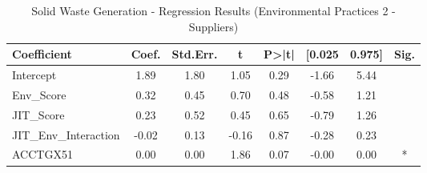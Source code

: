 \begin{table}[htbp]
    \centering
    \caption{Solid Waste Generation - Regression Results (Environmental Practices 2 - Suppliers)}
    \label{tab:regression}
    \begin{tabular}{lccccccc}
\toprule
Coefficient & Coef. & Std.Err. & t & P>|t| & [0.025 & 0.975] & Sig. \\
\midrule
Intercept & 1.89 & 1.80 & 1.05 & 0.29 & -1.66 & 5.44 &  \\
Env\_Score & 0.32 & 0.45 & 0.70 & 0.48 & -0.58 & 1.21 &  \\
JIT\_Score & 0.23 & 0.52 & 0.45 & 0.65 & -0.79 & 1.26 &  \\
JIT\_Env\_Interaction & -0.02 & 0.13 & -0.16 & 0.87 & -0.28 & 0.23 &  \\
ACCTGX51 & 0.00 & 0.00 & 1.86 & 0.07 & -0.00 & 0.00 & * \\
\bottomrule
\end{tabular}

    \end{table}
    